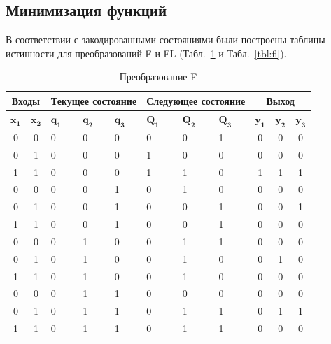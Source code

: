\documentclass[a4paper, final]{article}
\begin{document}
\subsection{Минимизация функций}
В соответствии с закодированными состояниями были построены таблицы истинности для преобразований F и FL (Табл.~\ref{tbl:f} и Табл.~\ref{tbl:fl}).

\begin{table}[h!]
  \centering
  \caption{Преобразование F}
  \label{tbl:f}
  \footnotesize

  \begin{tabularx}{0.8\textwidth}{|c|c|X|X|X||X|X|X|c|c|c|}
  \hline
  \multicolumn{2}{|c}{\textbf{Входы}} & \multicolumn{3}{|c||}{\textbf{Текущее состояние}} & \multicolumn{3}{c|}{\textbf{Следующее состояние}} & \multicolumn{3}{c|}{\textbf{Выход}} \\
  \hline
  $\mathbf{x_1}$& $\mathbf{x_2}$ & $\mathbf{q_1}$ & $\mathbf{q_2}$ & $\mathbf{q_3}$ & $\mathbf{Q_1}$ & $\mathbf{Q_2}$ & $\mathbf{Q_3}$ & $\mathbf{y_1}$ & $\mathbf{y_2}$ & $\mathbf{y_3}$ \\
  \hline
  \hline
  0 & 0 &   0 & 0 & 0 &  0 & 0 & 1 &  0 & 0 & 0 \\
  \hline
  0 & 1 &   0 & 0 & 0 &  1 & 0 & 0 &  0 & 0 & 0 \\
  \hline
  1 & 1 &   0 & 0 & 0 &  1 & 1 & 0 &  1 & 1 & 1 \\
  \hline

  0 & 0 &   0 & 0 & 1 &  0 & 1 & 0 &  0 & 0 & 0 \\
  \hline
  0 & 1 &   0 & 0 & 1 &  0 & 0 & 1 &  0 & 0 & 1 \\
  \hline
  1 & 1 &   0 & 0 & 1 &  0 & 0 & 1 &  0 & 0 & 0 \\

  \hline
  0 & 0 &   0 & 1 & 0 &  0 & 1 & 1 &  0 & 0 & 0 \\
  \hline
  0 & 1 &   0 & 1 & 0 &  0 & 1 & 0 &  0 & 1 & 0 \\
  \hline
  1 & 1 &   0 & 1 & 0 &  0 & 1 & 0 &  0 & 0 & 0 \\
  \hline
  
  0 & 0 &   0 & 1 & 1 &  0 & 0 & 0 &  0 & 0 & 0 \\
  \hline
  0 & 1 &   0 & 1 & 1 &  0 & 1 & 1 &  0 & 1 & 1 \\
  \hline
  1 & 1 &   0 & 1 & 1 &  0 & 1 & 1 &  0 & 0 & 0 \\
  \hline


\end{tabularx}
\end{table}
\end{document}
